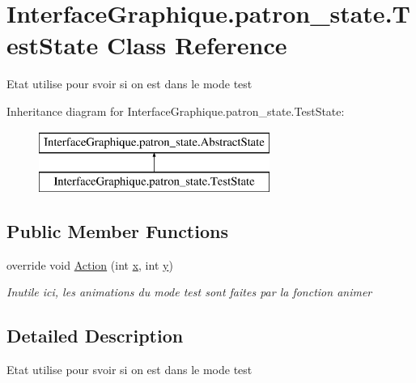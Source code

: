 \hypertarget{class_interface_graphique_1_1patron__state_1_1_test_state}{\section{Interface\-Graphique.\-patron\-\_\-state.\-Test\-State Class Reference}
\label{class_interface_graphique_1_1patron__state_1_1_test_state}
}


Etat utilise pour svoir si on est dans le mode test  


Inheritance diagram for Interface\-Graphique.\-patron\-\_\-state.\-Test\-State\-:\begin{figure}[H]
\begin{center}
\leavevmode
\includegraphics[height=2.000000cm]{class_interface_graphique_1_1patron__state_1_1_test_state}
\end{center}
\end{figure}
\subsection*{Public Member Functions}
\begin{DoxyCompactItemize}
\item 
override void \hyperlink{class_interface_graphique_1_1patron__state_1_1_test_state_ab7aa954cce22801d52158f3d70cbdcac}{Action} (int \hyperlink{group__inf2990_ga6150e0515f7202e2fb518f7206ed97dc}{x}, int \hyperlink{group__inf2990_ga0a2f84ed7838f07779ae24c5a9086d33}{y})
\begin{DoxyCompactList}\small\item\em Inutile ici, les animations du mode test sont faites par la fonction animer \end{DoxyCompactList}\end{DoxyCompactItemize}


\subsection{Detailed Description}
Etat utilise pour svoir si on est dans le mode test 




